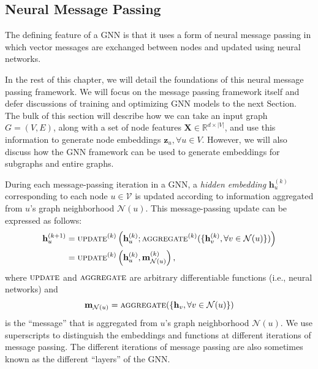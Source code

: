 \documentclass[10pt]{book}
\let\defaultmarginpar\marginpar
\renewcommand\marginpar[2][]{\defaultmarginpar{\itshape\color{gray}#2}}
\begin{document}
\subsection{Neural Message Passing}

The defining feature of a GNN is that it uses a form of neural message passing in which vector messages are exchanged between nodes and updated using neural networks.

In the rest of this chapter, we will detail the foundations of this neural message passing framework. We will focus on the message passing framework itself and defer discussions of training and optimizing GNN models to the next Section. The bulk of this section will describe how we can take an input graph $G = (V, E)$, along with a set of node features $\mathbf X \in \mathbb R^{d \times |V|}$, and use this information to generate node embeddings $\mathbf z_u, \forall u \in V$. However, we will also discuss how the GNN framework can be used to generate embeddings for subgraphs and entire graphs.

During each message-passing iteration in a GNN, a \emph{hidden embedding}\marginpar{hidden embedding} $\mathbf h^{(k)}_u$ corresponding to each node $u \in \mathcal V$ is updated according to information aggregated from $u$'s graph neighborhood $\mathcal N(u)$. This message-passing update can be expressed as follows:
\begin{align}
    \mathbf h^{(k+1)}_u &= \textsc{update}^{(k)} \left( \mathbf h^{(k)}_u; \textsc{aggregate}^{(k)}(\{\mathbf h^{(k)}_v, \forall v \in \mathcal N(u)\}) \right) 
    \label{eq:mess-pass} \\
    &= \textsc{update}^{(k)} \left( \mathbf h^{(k)}_u, \mathbf m^{(k)}_{\mathcal N(u)} \right),
    \label{eq:mess-pass2}
\end{align}
where $\textsc{update}$ and $\textsc{aggregate}$ are arbitrary differentiable functions (i.e., neural networks) and
\begin{equation}
    \mathbf m_{\mathcal N(u)} = \textsc{aggregate}(\{\mathbf h_v, \forall v \in \mathcal N(u)\})
\end{equation}
is the ``message'' that is aggregated from $u$'s graph neighborhood $\mathcal N(u)$. We use superscripts to distinguish the embeddings and functions at different iterations of message passing. The different iterations of message passing are also sometimes known as the different ``layers'' of the GNN.
\end{document}
